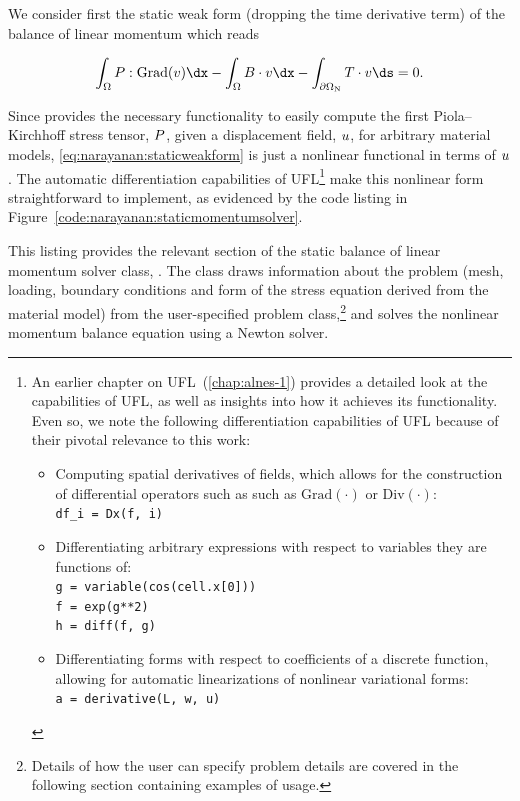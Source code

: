 We consider first the static weak form (dropping the time derivative
term) of the balance of linear momentum which reads

\begin{equation}
  \int_{\Omega} \bP:\mathrm{Grad}(\bv) \dx - \int_{\Omega} \bB
  \cdot \bv \dx -  \int_{\partial\Omega_{\mathrm{N}}} \bT \cdot
  \bv \ds = 0.
\label{eq:narayanan:staticweakform}
\end{equation}

\noindent Since \twist{} provides the necessary functionality to
easily compute the first Piola--Kirchhoff stress tensor, $\mbox{$ P$}$, given
a displacement field, $\mbox{$ u$}$, for arbitrary material models,
\eqref{eq:narayanan:staticweakform} is just a nonlinear functional in
terms of $\mbox{$ u$}$. The automatic differentiation capabilities of
UFL\footnote{An earlier chapter on UFL~(\ref{chap:alnes-1}) provides a
detailed look at the capabilities of UFL, as well as insights into how
it achieves its functionality. Even so, we note the following
differentiation capabilities of UFL because of their pivotal relevance
to this work:

\begin{itemize}
\item Computing spatial derivatives of fields, which allows for the
  construction of differential operators such as such as
  $\mathrm{Grad(\cdot)}$ or $\mathrm{Div(\cdot)}$:\\
  \texttt{df\_i = Dx(f, i)}
\item Differentiating arbitrary expressions with respect to variables
  they are functions of:\\
\texttt{g = variable(cos(cell.x[0]))}\\
\texttt{f = exp(g**2)}\\
\texttt{h = diff(f, g)}
\item Differentiating forms with respect to coefficients of a discrete
  function, allowing for automatic linearizations of nonlinear
  variational forms:\\
\texttt{a = derivative(L, w, u)}
\end{itemize}} make
this nonlinear form straightforward to implement, as evidenced by the
code listing in Figure~\ref{code:narayanan:staticmomentumsolver}.

This listing provides the relevant section of the static balance of
linear momentum solver class, . The
class draws information about the problem (mesh, loading, boundary
conditions and form of the stress equation derived from the material
model) from the user-specified problem class,\footnote{Details of how
the user can specify problem details are covered in the following
section containing examples of \twist{} usage.} and solves the
nonlinear momentum balance equation using a Newton solver.


